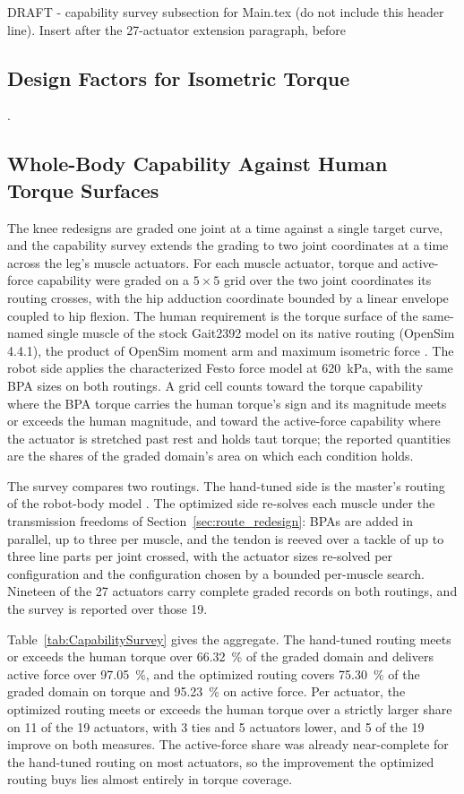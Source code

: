 DRAFT - capability survey subsection for Main.tex (do not include this header line).
Insert after the 27-actuator extension paragraph, before \subsection{Design Factors for Isometric Torque}.

\subsection{Whole-Body Capability Against Human Torque Surfaces}\label{sec:capability_survey}

The knee redesigns are graded one joint at a time against a single target curve, and the capability survey extends the grading to two joint coordinates at a time across the leg's muscle actuators. For each muscle actuator, torque and active-force capability were graded on a $5 \times 5$ grid over the two joint coordinates its routing crosses, with the hip adduction coordinate bounded by a linear envelope coupled to hip flexion. The human requirement is the torque surface of the same-named single muscle of the stock Gait2392 model on its native routing (OpenSim 4.4.1), the product of OpenSim moment arm and maximum isometric force \citep{delp_opensim_2007, seth_opensim_2018}. The robot side applies the characterized Festo force model \citep{bolen_2026} at \qty{620}{\kPa}, with the same BPA sizes on both routings. A grid cell counts toward the torque capability where the BPA torque carries the human torque's sign and its magnitude meets or exceeds the human magnitude, and toward the active-force capability where the actuator is stretched past rest and holds taut torque; the reported quantities are the shares of the graded domain's area on which each condition holds.

The survey compares two routings. The hand-tuned side is the master's routing of the robot-body model \citep{morrow_optimization_2020}. The optimized side re-solves each muscle under the transmission freedoms of Section~\ref{sec:route_redesign}: BPAs are added in parallel, up to three per muscle, and the tendon is reeved over a tackle of up to three line parts per joint crossed, with the actuator sizes re-solved per configuration and the configuration chosen by a bounded per-muscle search. Nineteen of the 27 actuators carry complete graded records on both routings, and the survey is reported over those 19.

Table~\ref{tab:CapabilitySurvey} gives the aggregate. The hand-tuned routing meets or exceeds the human torque over \qty{66.32}{\percent} of the graded domain and delivers active force over \qty{97.05}{\percent}, and the optimized routing covers \qty{75.30}{\percent} of the graded domain on torque and \qty{95.23}{\percent} on active force. Per actuator, the optimized routing meets or exceeds the human torque over a strictly larger share on 11 of the 19 actuators, with 3 ties and 5 actuators lower, and 5 of the 19 improve on both measures. The active-force share was already near-complete for the hand-tuned routing on most actuators, so the improvement the optimized routing buys lies almost entirely in torque coverage.

